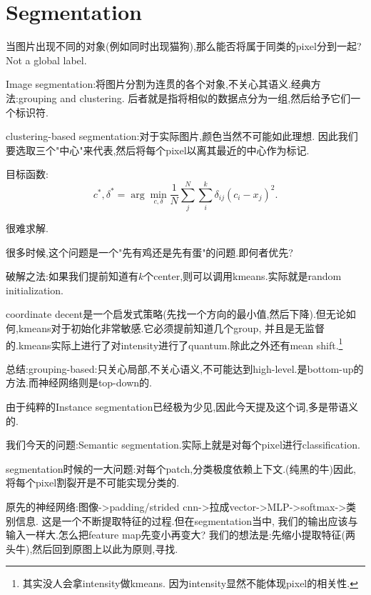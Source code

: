 \section{Segmentation}

当图片出现不同的对象(例如同时出现猫狗),那么能否将属于同类的pixel分到一起?Not a global label.

Image segmentation:将图片分割为连贯的各个对象,不关心其语义.经典方法:grouping and clustering.
后者就是指将相似的数据点分为一组,然后给予它们一个标识符.

clustering-based segmentation:对于实际图片,颜色当然不可能如此理想.
因此我们要选取三个"中心"来代表,然后将每个pixel以离其最近的中心作为标记.

目标函数:
\begin{equation}
	c^*, \delta^* = \arg \min_{c, \delta} \frac{1}{N} \sum_{j}^{N} \sum_{i}^{k} \delta_{ij} (c_i - x_j)^2.
\end{equation}

很难求解.

很多时候,这个问题是一个"先有鸡还是先有蛋"的问题.即何者优先?

破解之法:如果我们提前知道有$k$个center,则可以调用kmeans.实际就是random initialization.

coordinate decent是一个启发式策略(先找一个方向的最小值,然后下降).但无论如何,kmeans对于初始化非常敏感.它必须提前知道几个group,
并且是无监督的.kmeans实际上进行了对intensity进行了quantum.除此之外还有mean shift.\footnote{其实没人会拿intensity做kmeans.
因为intensity显然不能体现pixel的相关性.}

总结:grouping-based:只关心局部,不关心语义,不可能达到high-level.是bottom-up的方法.而神经网络则是top-down的.

由于纯粹的Instance segmentation已经极为少见,因此今天提及这个词,多是带语义的.

我们今天的问题:Semantic segmentation.实际上就是对每个pixel进行classification.

segmentation时候的一大问题:对每个patch,分类极度依赖上下文.(纯黑的牛)因此,将每个pixel割裂开是不可能实现分类的.

原先的神经网络:图像->padding/strided cnn->拉成vector->MLP->softmax->类别信息.
这是一个不断提取特征的过程.但在segmentation当中,
我们的输出应该与输入一样大.怎么把feature map先变小再变大?
我们的想法是:先缩小提取特征(两头牛),然后回到原图上以此为原则,寻找.

